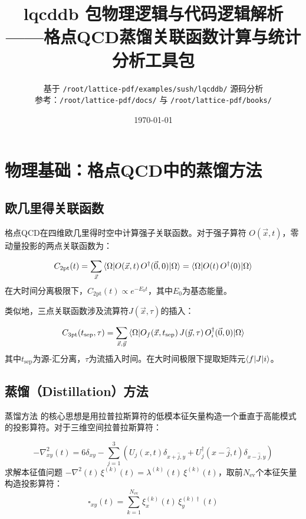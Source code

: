 \documentclass[11pt,a4paper]{ctexart}
\title{\Huge \textbf{lqcddb} 包物理逻辑与代码逻辑解析\\
\large ——格点QCD蒸馏关联函数计算与统计分析工具包}
\author{基于 \texttt{/root/lattice-pdf/examples/sush/lqcddb/} 源码分析\\
参考：\texttt{/root/lattice-pdf/docs/} 与 \texttt{/root/lattice-pdf/books/}}
\date{\today}
\begin{document}
\maketitle
\tableofcontents
\newpage

\section{物理基础：格点QCD中的蒸馏方法}

\subsection{欧几里得关联函数}

格点QCD在四维欧几里得时空中计算强子关联函数。对于强子算符 $O(\vec{x},t)$，零动量投影的两点关联函数为：

\begin{physicsbox}[两点关联函数定义]
\begin{equation}
C_{2\mathrm{pt}}(t) = \sum_{\vec{x}} \braket{\Omega | O(\vec{x}, t) \, O^{\dagger}(\vec{0}, 0) | \Omega}
= \braket{\Omega | O(t) \, O^{\dagger}(0) | \Omega}
\end{equation}
在大时间分离极限下，$C_{2\mathrm{pt}}(t) \propto e^{-E_0 t}$，其中$E_0$为基态能量。
\end{physicsbox}

类似地，三点关联函数涉及流算符$J(\vec{x},\tau)$的插入：

\begin{physicsbox}[三点关联函数]
\begin{equation}
C_{3\mathrm{pt}}(t_{\mathrm{sep}}, \tau) = \sum_{\vec{x},\vec{y}}
\braket{\Omega | O_f(\vec{x}, t_{\mathrm{sep}}) \, J(\vec{y}, \tau) \, O_i^{\dagger}(\vec{0}, 0) | \Omega}
\end{equation}
其中$t_{\mathrm{sep}}$为源-汇分离，$\tau$为流插入时间。在大时间极限下提取矩阵元$\braket{f|J|i}$。
\end{physicsbox}

\subsection{蒸馏（Distillation）方法}

蒸馏方法 \cite{Peardon:2009gh} 的核心思想是用拉普拉斯算符的低模本征矢量构造一个垂直于高能模式的投影算符。对于三维空间拉普拉斯算符：

\begin{physicsbox}[蒸馏投影算符]
\begin{equation}
-\nabla^2_{xy}(t) = 6\delta_{xy} - \sum_{j=1}^{3} \left( U_j(x,t)\delta_{x+\hat{j},y} + U_j^{\dagger}(x-\hat{j},t)\delta_{x-\hat{j},y} \right)
\end{equation}
求解本征值问题 $-\nabla^2(t) \, \xi^{(k)}(t) = \lambda^{(k)}(t) \, \xi^{(k)}(t)$，取前$N_{\mathrm{ev}}$个本征矢量构造投影算符：
\begin{equation}
\square_{xy}(t) = \sum_{k=1}^{N_{\mathrm{ev}}} \xi^{(k)}_x(t) \, \xi^{(k)\dagger}_y(t)
\end{equation}
\end{physicsbox}
\end{document}
